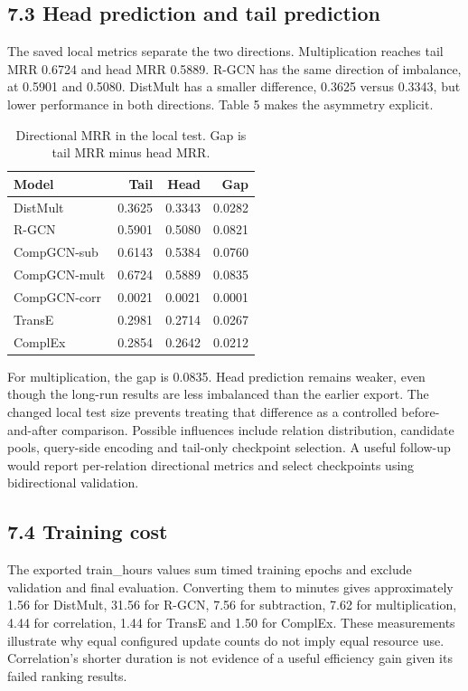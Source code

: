 \documentclass[11pt]{article}
\begin{document}
\subsection*{7.3 Head prediction and tail prediction}
The saved local metrics separate the two directions. Multiplication reaches tail MRR 0.6724 and head MRR 0.5889. R-GCN has the same direction of imbalance, at 0.5901 and 0.5080. DistMult has a smaller difference, 0.3625 versus 0.3343, but lower performance in both directions. Table 5 makes the asymmetry explicit.

\begin{table}[t]\centering\small
\setlength{\tabcolsep}{3pt}
\begin{tabular}{lrrr}
\toprule
Model & Tail & Head & Gap \\ \midrule
DistMult & 0.3625 & 0.3343 & 0.0282 \\
R-GCN & 0.5901 & 0.5080 & 0.0821 \\
CompGCN-sub & 0.6143 & 0.5384 & 0.0760 \\
CompGCN-mult & 0.6724 & 0.5889 & 0.0835 \\
CompGCN-corr & 0.0021 & 0.0021 & 0.0001 \\
TransE & 0.2981 & 0.2714 & 0.0267 \\
ComplEx & 0.2854 & 0.2642 & 0.0212 \\
\bottomrule\end{tabular}
\caption{Directional MRR in the local test. Gap is tail MRR minus head MRR.}\end{table}
For multiplication, the gap is 0.0835. Head prediction remains weaker, even though the long-run results are less imbalanced than the earlier export. The changed local test size prevents treating that difference as a controlled before-and-after comparison. Possible influences include relation distribution, candidate pools, query-side encoding and tail-only checkpoint selection. A useful follow-up would report per-relation directional metrics and select checkpoints using bidirectional validation.

\subsection*{7.4 Training cost}
The exported train\_hours values sum timed training epochs and exclude validation and final evaluation. Converting them to minutes gives approximately 1.56 for DistMult, 31.56 for R-GCN, 7.56 for subtraction, 7.62 for multiplication, 4.44 for correlation, 1.44 for TransE and 1.50 for ComplEx. These measurements illustrate why equal configured update counts do not imply equal resource use. Correlation's shorter duration is not evidence of a useful efficiency gain given its failed ranking results.
\end{document}
